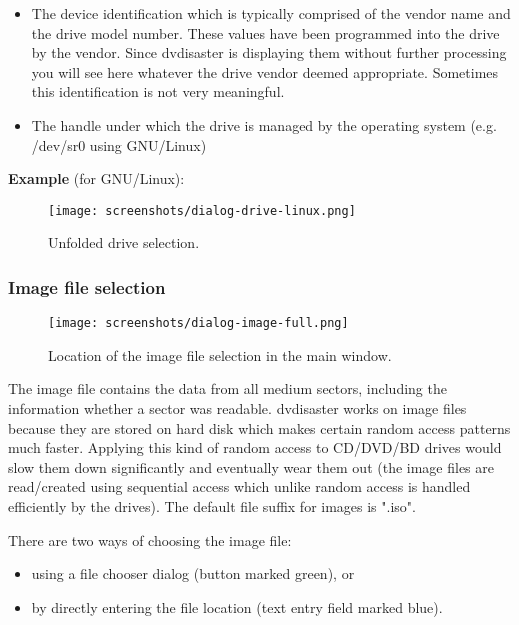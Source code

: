 \begin{itemize}
\item The device identification which is typically comprised
  of the vendor name and the drive model number. These values
  have been programmed into the drive by the vendor. Since dvdisaster
  is displaying them without further processing you will see here whatever
  the drive vendor deemed appropriate. Sometimes this identification
  is not very meaningful.
\item The handle under which the drive is managed by the operating
  system (e.g. /dev/sr0 using GNU/Linux)
\end{itemize}

\bigskip

{\bf Example} (for GNU/Linux):

\bigskip

\begin{figure}[h]
\centerline{\texttt{[image: screenshots/dialog-drive-linux.png]}}
\caption{Unfolded drive selection.}
\label{howto-dialog-drive-linux}
\end{figure}

\subsubsection{Image file selection}
\label{howto-dialogs-image}

\begin{figure}[h]
\centerline{\texttt{[image: screenshots/dialog-image-full.png]}}
\caption{Location of the image file selection in the main window.}
\label{howto-dialog-image-full}
\end{figure}

The image file contains the data from all medium sectors,
including the information whether a sector was readable.
dvdisaster works on image files because they are stored on
hard disk which makes certain random access patterns much faster.
Applying this kind of random access to CD/DVD/BD drives would slow
them down significantly and eventually wear them out (the image
files are read/created using sequential access which unlike random
access is handled efficiently by the drives). The default file
suffix for images is ".iso".

\bigskip

There are two ways of choosing the image file:

\begin{itemize}
\item using a file chooser dialog (button marked green), or
\item by directly entering the file location (text entry field marked blue).
\end{itemize}


